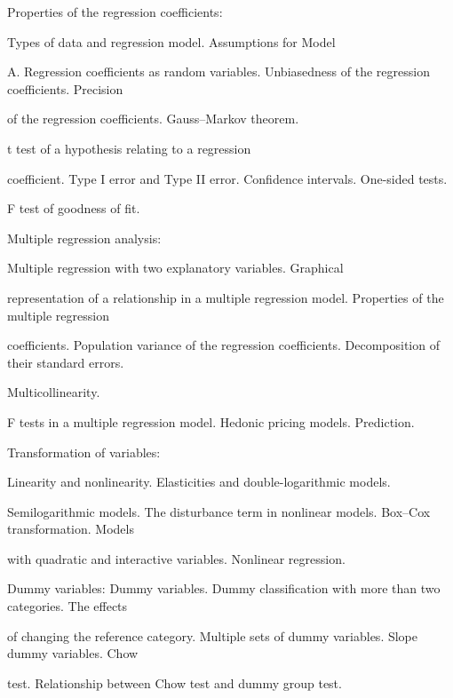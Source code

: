 
Properties of the regression coefficients:

Types of data and regression model. Assumptions for Model

A. Regression coefficients as random variables. Unbiasedness of the regression coefficients. Precision

of the regression coefficients. Gauss–Markov theorem.

t test of a hypothesis relating to a regression

coefficient. Type I error and Type II error. Confidence intervals. One-sided tests.

F test of goodness of fit.

Multiple regression analysis:

Multiple regression with two explanatory variables. Graphical

representation of a relationship in a multiple regression model. Properties of the multiple regression

coefficients. Population variance of the regression coefficients. Decomposition of their standard errors.

Multicollinearity.

F tests in a multiple regression model. Hedonic pricing models. Prediction.

Transformation of variables:

Linearity and nonlinearity. Elasticities and double-logarithmic models.

Semilogarithmic models. The disturbance term in nonlinear models. Box–Cox transformation. Models

with quadratic and interactive variables. Nonlinear regression.

Dummy variables: Dummy variables. Dummy classification with more than two categories. The effects

of changing the reference category. Multiple sets of dummy variables. Slope dummy variables. Chow

test. Relationship between Chow test and dummy group test.


